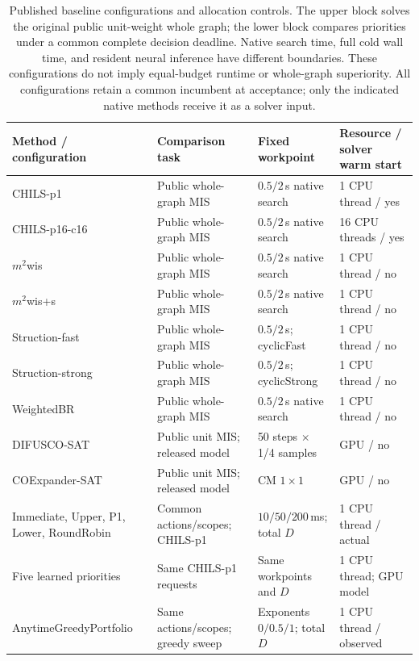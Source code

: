 \begin{table}[t]
\centering
\caption{Published baseline configurations and allocation controls.
The upper block solves the original public unit-weight whole graph; the lower
block compares priorities under a common complete decision deadline.
Native search time, full cold wall time, and resident neural inference have
different boundaries. These configurations do not imply equal-budget runtime
or whole-graph superiority. All configurations retain a common incumbent at
acceptance; only the indicated native methods receive it as a solver input.}
\label{tab:baseline-configuration}
\small
\setlength{\tabcolsep}{4pt}
\begin{tabular}{@{}p{}p{}p{}p{}@{}}
\toprule
Method / configuration & Comparison task & Fixed workpoint & Resource / solver warm start \\
\midrule
CHILS-p1~\cite{grossmann2025chils} & Public whole-graph MIS & $0.5/2$\,s native search & 1 CPU thread / yes \\
CHILS-p16-c16~\cite{grossmann2025chils} & Public whole-graph MIS & $0.5/2$\,s native search & 16 CPU threads / yes \\
$m^2$wis~\cite{grossmann2024mwis} & Public whole-graph MIS & $0.5/2$\,s native search & 1 CPU thread / no \\
$m^2$wis+s~\cite{grossmann2024mwis} & Public whole-graph MIS & $0.5/2$\,s native search & 1 CPU thread / no \\
Struction-fast~\cite{gellner2021struction} & Public whole-graph MIS & $0.5/2$\,s; cyclicFast & 1 CPU thread / no \\
Struction-strong~\cite{gellner2021struction} & Public whole-graph MIS & $0.5/2$\,s; cyclicStrong & 1 CPU thread / no \\
WeightedBR~\cite{lamm2019exact} & Public whole-graph MIS & $0.5/2$\,s native search & 1 CPU thread / no \\
DIFUSCO-SAT~\cite{sun2023difusco} & Public unit MIS; released model & 50 steps $\times$ 1/4 samples & GPU / no \\
COExpander-SAT~\cite{ma2025coexpander} & Public unit MIS; released model & CM $1\times1$ & GPU / no \\
\midrule
Immediate, Upper, P1, Lower, RoundRobin & Common actions/scopes; CHILS-p1~\cite{grossmann2025chils} & $10/50/200$\,ms; total $D$ & 1 CPU thread / actual \\
Five learned priorities & Same CHILS-p1~\cite{grossmann2025chils} requests & Same workpoints and $D$ & 1 CPU thread; GPU model \\
AnytimeGreedyPortfolio & Same actions/scopes; greedy sweep & Exponents $0/0.5/1$; total $D$ & 1 CPU thread / observed \\
\bottomrule
\end{tabular}
\end{table}
